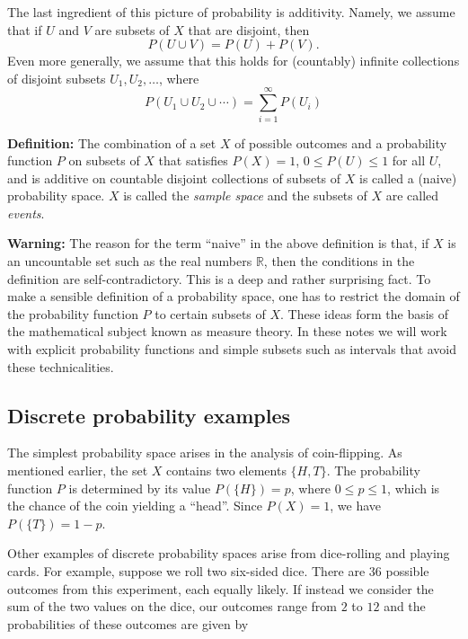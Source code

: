 \documentclass[
  11pt,
  letterpaper,
]{scrbook}
\theoremstyle{plain}
\theoremstyle{plain}
\theoremstyle{remark}
\begin{document}
The last ingredient of this picture of probability is additivity.
Namely, we assume that if \(U\) and \(V\) are subsets of \(X\) that are
disjoint, then \[
P(U\cup V)=P(U)+P(V).
\] Even more generally, we assume that this holds for (countably)
infinite collections of disjoint subsets \(U_1,U_2,\ldots\), where \[
P(U_1\cup U_2\cup\cdots)=\sum_{i=1}^{\infty} P(U_i)
\]

\textbf{Definition:} The combination of a set \(X\) of possible outcomes
and a probability function \(P\) on subsets of \(X\) that satisfies
\(P(X)=1\), \(0\le P(U)\le 1\) for all \(U\), and is additive on
countable disjoint collections of subsets of \(X\) is called a (naive)
probability space. \(X\) is called the \emph{sample space} and the
subsets of \(X\) are called \emph{events}.

\textbf{Warning:} The reason for the term ``naive'' in the above
definition is that, if \(X\) is an uncountable set such as the real
numbers \(\mathbb{R}\), then the conditions in the definition are
self-contradictory. This is a deep and rather surprising fact. To make a
sensible definition of a probability space, one has to restrict the
domain of the probability function \(P\) to certain subsets of \(X\).
These ideas form the basis of the mathematical subject known as measure
theory. In these notes we will work with explicit probability functions
and simple subsets such as intervals that avoid these technicalities.

\hypertarget{discrete-probability-examples}{%
\subsection{Discrete probability
examples}\label{discrete-probability-examples}}

The simplest probability space arises in the analysis of coin-flipping.
As mentioned earlier, the set \(X\) contains two elements \(\{H,T\}\).
The probability function \(P\) is determined by its value
\(P(\{H\})=p\), where \(0\le p\le 1\), which is the chance of the coin
yielding a ``head''. Since \(P(X)=1\), we have \(P(\{T\})=1-p\).

Other examples of discrete probability spaces arise from dice-rolling
and playing cards. For example, suppose we roll two six-sided dice.
There are \(36\) possible outcomes from this experiment, each equally
likely. If instead we consider the sum of the two values on the dice,
our outcomes range from \(2\) to \(12\) and the probabilities of these
outcomes are given by
\end{document}
